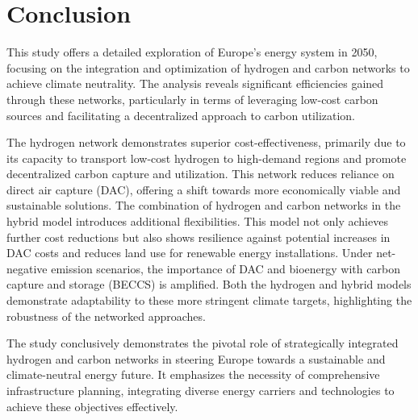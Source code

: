 \documentclass[twocolumn]{article}
\begin{document}
\section{Conclusion}
\label{sec:conclusion}

This study offers a detailed exploration of Europe's energy system in 2050, focusing on the integration and optimization of hydrogen and carbon networks to achieve climate neutrality. The analysis reveals significant efficiencies gained through these networks, particularly in terms of leveraging low-cost carbon sources and facilitating a decentralized approach to carbon utilization.

The hydrogen network demonstrates superior cost-effectiveness, primarily due to its capacity to transport low-cost hydrogen to high-demand regions and promote decentralized carbon capture and utilization. This network reduces reliance on direct air capture (DAC), offering a shift towards more economically viable and sustainable solutions.
The combination of hydrogen and carbon networks in the hybrid model introduces additional flexibilities. This model not only achieves further cost reductions but also shows resilience against potential increases in DAC costs and reduces land use for renewable energy installations.
Under net-negative emission scenarios, the importance of DAC and bioenergy with carbon capture and storage (BECCS) is amplified. Both the hydrogen and hybrid models demonstrate adaptability to these more stringent climate targets, highlighting the robustness of the networked approaches.


The study conclusively demonstrates the pivotal role of strategically integrated hydrogen and carbon networks in steering Europe towards a sustainable and climate-neutral energy future. It emphasizes the necessity of comprehensive infrastructure planning, integrating diverse energy carriers and technologies to achieve these objectives effectively.


\printbibliography

\appendix


\end{document}
